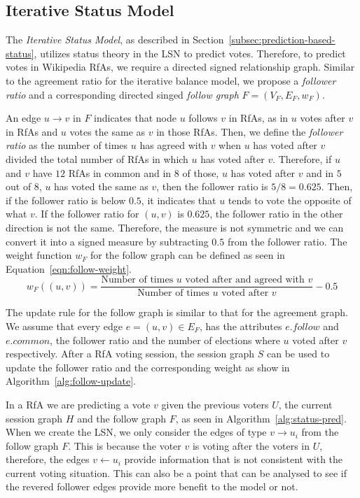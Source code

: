 \subsection{Iterative Status Model}
The \textit{Iterative Status Model}, as described in Section~\ref{subsec:prediction-based-status}, utilizes status theory in the LSN to predict votes.
Therefore, to predict votes in Wikipedia RfAs, we require a directed signed relationship graph.
Similar to the agreement ratio for the iterative balance model, we propose a \textit{follower ratio} and a corresponding directed singed \textit{follow graph} $F=(V_{F},E_{F},w_{F})$.

An edge $u \rightarrow v$ in $F$ indicates that node $u$ follows $v$ in RfAs, as in $u$ votes after $v$ in RfAs and $u$ votes the same as $v$ in those RfAs.
Then, we define the \textit{follower ratio} as the number of times $u$ has agreed with $v$ when $u$ has voted after $v$ divided the total number of RfAs in which $u$ has voted after $v$.
Therefore, if $u$ and $v$ have $12$ RfAs in common and in $8$ of those, $u$ has voted after $v$  and in $5$ out of $8$, $u$ has voted the same as $v$, then the follower ratio is $5/8 = 0.625$.  
Then, if the follower ratio is below $0.5$, it indicates that $u$ tends to vote the opposite of what $v$.
If the follower ratio for $(u,v)$ is $0.625$, the follower ratio in the other direction is not the same.
Therefore, the measure is not symmetric and we can convert it into a signed measure by subtracting $0.5$ from the follower ratio.
The weight function $w_{F}$ for the follow graph can be defined as seen in Equation~\eqref{eqn:follow-weight}. 
\begin{equation}
    \label{eqn:follow-weight}
    w_{F}((u,v)) = \frac{\text{Number of times } u \text{ voted after and agreed with } v }{\text{Number of times } u \text{ voted after } v} -0.5
\end{equation}

The update rule for the follow graph is similar to that for the agreement graph.
We assume that every edge $e=(u,v) \in E_{F}$, has the attributes $e.follow$ and $e.common$, the follower ratio and the number of elections where $u$ voted after $v$ respectively.
After a RfA voting session, the session graph $S$ can be used to update the follower ratio and the corresponding weight as show in Algorithm~\ref{alg:follow-update}.

In a RfA we are predicting a vote $v$ given the previous voters $U$, the current session graph $H$ and the follow graph $F$, as seen in Algorithm~\ref{alg:status-pred}.
When we create the LSN, we only consider the edges of type $v \rightarrow u_{i}$ from the follow graph $F$.
This is because the voter $v$ is voting after the voters in $U$, therefore, the edges $v \leftarrow u_{i}$ provide information that is not consistent with the current voting situation.
This can also be a point that can be analysed to see if the revered follower edges provide more benefit to the model or not.

